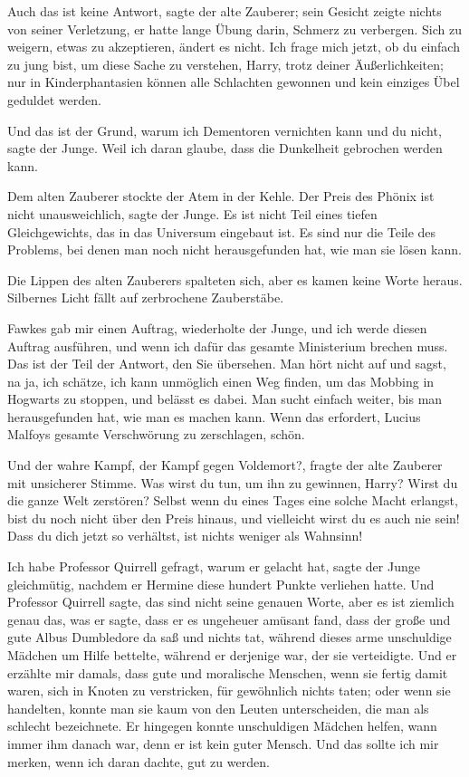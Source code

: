 \glqq Auch das ist keine Antwort\grqq{}, sagte der alte Zauberer; sein Gesicht
zeigte nichts von seiner Verletzung, er hatte lange Übung darin, Schmerz zu
verbergen. \glqq Sich zu weigern, etwas zu akzeptieren, ändert es nicht. Ich
frage mich jetzt, ob du einfach zu jung bist, um diese Sache zu verstehen,
Harry, trotz deiner Äußerlichkeiten; nur in Kinderphantasien können alle
Schlachten gewonnen und kein einziges Übel geduldet werden.\grqq{}

\glqq Und das ist der Grund, warum ich Dementoren vernichten kann und du
nicht\grqq{}, sagte der Junge. \glqq Weil ich daran glaube, dass die Dunkelheit
gebrochen werden kann.\grqq{}

Dem alten Zauberer stockte der Atem in der Kehle. \glqq Der Preis des Phönix ist
nicht unausweichlich\grqq{}, sagte der Junge. \glqq Es ist nicht Teil eines
tiefen Gleichgewichts, das in das Universum eingebaut ist. Es sind nur die Teile
des Problems, bei denen man noch nicht herausgefunden hat, wie man sie lösen
kann.\grqq{}

Die Lippen des alten Zauberers spalteten sich, aber es kamen keine Worte heraus.
Silbernes Licht fällt auf zerbrochene Zauberstäbe.

\glqq Fawkes gab mir einen Auftrag\grqq{}, wiederholte der Junge, \glqq und ich
werde diesen Auftrag ausführen, und wenn ich dafür das gesamte Ministerium
brechen muss. Das ist der Teil der Antwort, den Sie übersehen. Man hört nicht
auf und sagst, na ja, ich schätze, ich kann unmöglich einen Weg finden, um das
Mobbing in Hogwarts zu stoppen, und belässt es dabei. Man sucht einfach weiter,
bis man herausgefunden hat, wie man es machen kann. Wenn das erfordert, Lucius
Malfoys gesamte Verschwörung zu zerschlagen, schön.\grqq{}

\glqq Und der wahre Kampf, der Kampf gegen Voldemort?\grqq{}, fragte der alte
Zauberer mit unsicherer Stimme. \glqq Was wirst du tun, um ihn zu gewinnen,
Harry? Wirst du die ganze Welt zerstören? Selbst wenn du eines Tages eine solche
Macht erlangst, bist du noch nicht über den Preis hinaus, und vielleicht wirst
du es auch nie sein! Dass du dich jetzt so verhältst, ist nichts weniger als
Wahnsinn!\grqq{}

\glqq Ich habe Professor Quirrell gefragt, warum er gelacht hat\grqq{}, sagte
der Junge gleichmütig, \glqq nachdem er Hermine diese hundert Punkte verliehen
hatte. Und Professor Quirrell sagte, das sind nicht seine genauen Worte, aber es
ist ziemlich genau das, was er sagte, dass er es ungeheuer amüsant fand, dass
der große und gute Albus Dumbledore da saß und nichts tat, während dieses arme
unschuldige Mädchen um Hilfe bettelte, während er derjenige war, der sie
verteidigte. Und er erzählte mir damals, dass gute und moralische Menschen, wenn
sie fertig damit waren, sich in Knoten zu verstricken, für gewöhnlich nichts
taten; oder wenn sie handelten, konnte man sie kaum von den Leuten
unterscheiden, die man als schlecht bezeichnete. Er hingegen konnte unschuldigen
Mädchen helfen, wann immer ihm danach war, denn er ist kein guter Mensch. Und
das sollte ich mir merken, wenn ich daran dachte, gut zu werden.\grqq{}

